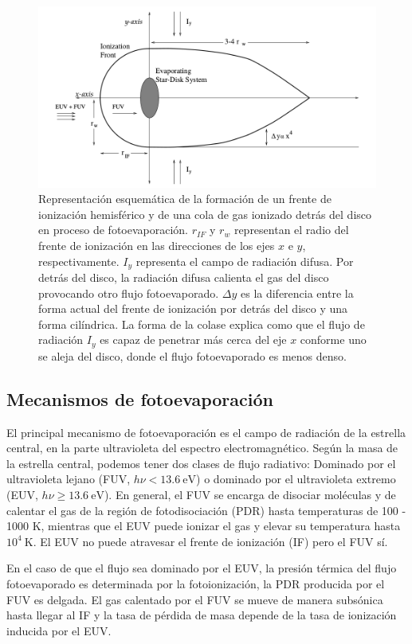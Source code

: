 \begin{figure}
  \includegraphics[width=0.8\linewidth]{./Figures/Johnstone-shape}
  \caption{Representación esquemática de la formación de un frente de ionización hemisférico y de una cola de gas ionizado detrás del disco en proceso de fotoevaporación. $r_{IF}$ y $r_w$ representan el radio del frente de ionización en las direcciones de los ejes $x$ e $y$, respectivamente. $I_y$ representa el campo de radiación difusa. Por detrás del disco, la radiación difusa calienta el gas del disco provocando otro flujo fotoevaporado. $\Delta y$ es la diferencia entre la forma actual del frente de ionización por detrás del disco y una forma cilíndrica. La forma de la colase explica como que el flujo de radiación $I_y$ es capaz de penetrar más cerca del eje $x$ conforme uno se aleja del disco, donde el flujo fotoevaporado es menos denso.}
    \label{fig:prop-shape}
\end{figure}


\subsection{Mecanismos de fotoevaporación \citep{Johnstone:1998}}

El principal mecanismo de fotoevaporación es el campo de radiación de la estrella central, en la parte ultravioleta del espectro electromagnético. Según la masa de la estrella central, podemos tener dos clases de flujo radiativo: Dominado por el ultravioleta lejano (FUV, $h\nu < 13.6~\mathrm{eV}$) o dominado por el ultravioleta extremo (EUV, $h\nu \geq 13.6~\mathrm{eV}$). En general, el FUV se encarga de disociar moléculas y de calentar el gas de la región de fotodisociación (PDR) hasta temperaturas de 100 - 1000 K, mientras que el EUV puede ionizar el gas y elevar su temperatura hasta $10^4~\mathrm{K}$. El EUV no puede atravesar el frente de ionización (IF) pero el FUV sí.

En el caso de que el flujo sea dominado por el EUV, la presión térmica del flujo fotoevaporado es determinada por la fotoionización, la PDR producida
por el FUV es delgada. El gas calentado por el FUV se mueve de manera subsónica hasta llegar al IF y la tasa de pérdida de masa depende de la tasa de ionización inducida por el EUV.

